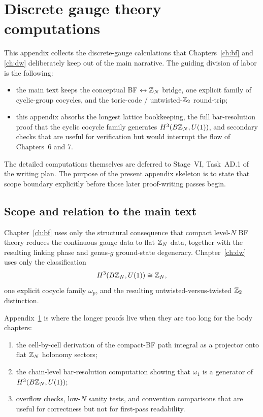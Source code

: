 \chapter{Discrete gauge theory computations}\label{app:bf-zn}

This appendix collects the discrete-gauge calculations that Chapters~\ref{ch:bf} and \ref{ch:dw} deliberately keep out of the main narrative. The guiding division of labor is the following:
\begin{itemize}
\item the main text keeps the conceptual BF $\leftrightarrow \mathbb{Z}_N$ bridge, one explicit family of cyclic-group cocycles, and the toric-code / untwisted-$\mathbb{Z}_2$ round-trip;
\item this appendix absorbs the longest lattice bookkeeping, the full bar-resolution proof that the cyclic cocycle family generates $H^3(B\mathbb{Z}_N,U(1))$, and secondary checks that are useful for verification but would interrupt the flow of Chapters~6 and 7.
\end{itemize}
The detailed computations themselves are deferred to Stage~VI, Task~AD.1 of the writing plan. The purpose of the present appendix skeleton is to state that scope boundary explicitly before those later proof-writing passes begin.

\section{Scope and relation to the main text}\label{sec:appD-scope}

Chapter~\ref{ch:bf} uses only the structural consequence that compact level-$N$ BF theory reduces the continuous gauge data to flat $\mathbb{Z}_N$ data, together with the resulting linking phase and genus-$g$ ground-state degeneracy. Chapter~\ref{ch:dw} uses only the classification
\begin{equation*}
H^3(B\mathbb{Z}_N,U(1))\cong \mathbb{Z}_N,
\end{equation*}
one explicit cocycle family $\omega_p$, and the resulting untwisted-versus-twisted $\mathbb{Z}_2$ distinction.

\medskip

\noindent Appendix~\ref{app:bf-zn} is where the longer proofs live when they are too long for the body chapters:
\begin{enumerate}
\item the cell-by-cell derivation of the compact-BF path integral as a projector onto flat $\mathbb{Z}_N$ holonomy sectors;
\item the chain-level bar-resolution computation showing that $\omega_1$ is a generator of $H^3(B\mathbb{Z}_N,U(1))$;
\item overflow checks, low-$N$ sanity tests, and convention comparisons that are useful for correctness but not for first-pass readability.
\end{enumerate}

